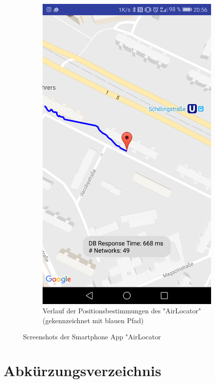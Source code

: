 \documentclass[11pt,a4paper]{article}
\begin{document}
\begin{figure}[htbp]
\begin{subfigure}[htbp]{0.38\textwidth}
        \includegraphics[width=\textwidth]{pics/screenshots/AirLocator_Multi_Pos.png}
        \caption{Verlauf der Positionsbestimmungen des "AirLocator" (gekennzeichnet mit blauen Pfad)}
        \label{fig:AirLocator_Multi_Pos}
    \end{subfigure}
    \caption{Screenshots der Smartphone App "AirLocator}
    \label{fig:ScreenShots_AirLocator}
\end{figure}


\newpage
\section{Abkürzungsverzeichnis}
\end{document}
